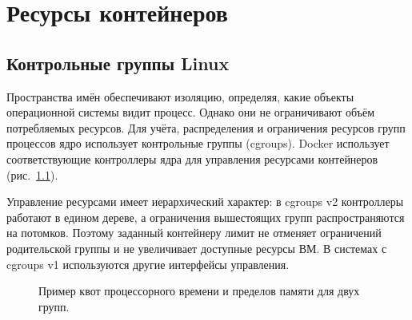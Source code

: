 \chapter{Ресурсы контейнеров}
\label{ch:23-docker-resources}
\begingroup
\setlength{\parskip}{0pt}
\setlength{\parindent}{1.25cm}
\makeatletter
\let\@afterindentfalse\@afterindenttrue
\@afterindenttrue
\makeatother
\setlength{\intextsep}{8pt plus 2pt minus 2pt}
\setlength{\textfloatsep}{10pt plus 2pt minus 2pt}
\raggedbottom
{}
\captionsetup[figure]{font=footnotesize,justification=centering,singlelinecheck=false}

\section{Контрольные группы Linux}

Пространства имён обеспечивают изоляцию, определяя, какие объекты операционной системы видит процесс. Однако они не ограничивают объём потребляемых ресурсов. Для учёта, распределения и ограничения ресурсов групп процессов ядро использует контрольные группы (cgroups). Docker использует соответствующие контроллеры ядра для управления ресурсами контейнеров (рис.~\ref*{fig:cgroups}).

Управление ресурсами имеет иерархический характер: в cgroups v2 контроллеры работают в едином дереве, а ограничения вышестоящих групп распространяются на потомков. Поэтому заданный контейнеру лимит не отменяет ограничений родительской группы и не увеличивает доступные ресурсы ВМ. В системах с cgroups v1 используются другие интерфейсы управления.

\begin{figure}[!htb]
  \centering
  \caption{Пример квот процессорного времени и пределов памяти для двух групп.}
  \label{fig:cgroups}
\end{figure}

